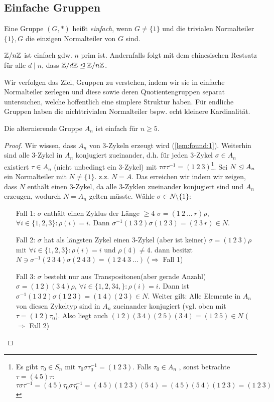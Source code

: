 \documentclass[../main.tex]{subfiles}
\begin{document}
\subsection{Einfache Gruppen}
\begin{definition}
Eine Gruppe $(G,*)$ heißt \emph{einfach}, wenn $G \neq \{1\}$ und die trivialen Normalteiler $\{1\}, G$ die einzigen Normalteiler von $G$ sind.
\end{definition}
\begin{example}
    $\mathbb{Z}/n\mathbb{Z}$ ist einfach gdw. $n$ prim ist. Andernfalls folgt mit dem chinesischen Restsatz für alle $d \mid n$, dass $\mathbb{Z}/d\mathbb{Z} \trianglelefteq \mathbb{Z}/n\mathbb{Z}$.
\end{example}
Wir verfolgen das Ziel, Gruppen zu verstehen, indem wir sie in einfache Normalteiler zerlegen und diese sowie deren Quotientengruppen separat untersuchen, welche hoffentlich eine simplere Struktur haben. Für endliche Gruppen haben die nichttrivialen Normalteiler bspw. echt kleinere Kardinalität.
\begin{theorem}[$A_5$]
Die alternierende Gruppe $A_n$ ist einfach für $n \geq 5$.
\end{theorem}
\begin{proof}
Wir wissen, dass $A_n$ von 3-Zykeln erzeugt wird (\cref{lem:found:1}).
Weiterhin sind alle 3-Zykel in $A_n$ konjugiert zueinander, d.h. für jeden 3-Zykel $\sigma \in A_n$ existiert $\tau \in A_n$ (nicht unbedingt ein 3-Zykel) mit $\tau\sigma\tau^{-1} = (1\ 2\ 3)$\footnote{Es gibt $\tau_0\in S_n$ mit $\tau_0\sigma\tau_0^{-1}=(1\ 2\ 3)$. Falls $\tau_0 \in A_n$ \checkmark, sonst betrachte $\tau = (4\ 5)\tau$: $\tau \sigma \tau^{-1} = (4\ 5)\tau_0\sigma\tau_0^{-1} =(4\ 5)(1\ 2\ 3)(5\ 4) = (4\ 5)(5\ 4)(1\ 2\ 3)=(1\ 2\ 3)$}.
Sei $N\trianglelefteq A_n$ ein Normalteiler mit $N\neq \{1\}$. z.z. $N=A$. Das erreichen wir indem wir zeigen, dass $N$ enthält einen $3$-Zykel, da alle $3$-Zyklen zueinander konjugiert sind und $A_n$ erzeugen, wodurch $N=A_n$ gelten müsste.
Wähle $\sigma \in N\setminus\{1\}$:
\begin{itemize}[font=\itshape,align= left]
    \item[Fall 1: $\sigma$ enthält einen Zyklus der Länge $\geq 4$] \obda $\sigma=(1\ 2\ \dots\ r) \rho$, $\forall i\in\{1,2,3\}:\rho(i)=i$. Dann $\sigma^{-1}(1\ 3\ 2)\sigma(1\ 2\ 3) = (2\ 3\ r)\in N$.
    \item[Fall 2: $\sigma$ hat als längsten Zykel einen 3-Zykel (aber ist keiner)] \obda $\sigma = (1\ 2\ 3)\rho$ mit $\forall i\in\{1,2,3\}:\rho(i)=i$ und $\rho(4)\neq 4$. dann besitzt $N\ni \sigma^{-1}(2\ 3\ 4)\sigma (2\ 4\ 3) = (1\ 2\ 4\ 3\ \dots)$ ($\Rightarrow$ Fall 1)
    \item[Fall 3: $\sigma$ besteht nur aus Transpositonen(aber gerade Anzahl)] \obda $\sigma = (1\ 2)(3\ 4)\rho$, $\forall i\in\{1,2,34,\}:\rho(i)=i$. Dann ist $\sigma^{-1}(1\ 3\ 2)\sigma(1\ 2\ 3)=(1\ 4)(2\ 3)\in N$. Weiter gilt: Alle Elemente in $A_n$ von diesen Zykeltyp sind in $A_n$ zueinander konjugiert (vgl. oben mit $\tau=(1\ 2)\tau_0$). Also liegt auch $(1\ 2)(3\ 4)(2\ 5) (3\ 4) = (1\ 2\ 5) \in N$ ($\Rightarrow$ Fall 2)
\end{itemize}

\end{proof}
\end{document}
